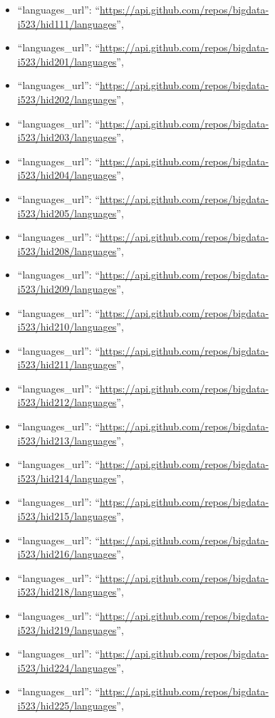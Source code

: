 \begin{itemize}
\item
  ``languages\_url'':
  ``\url{https://api.github.com/repos/bigdata-i523/hid111/languages}'',
\item
  ``languages\_url'':
  ``\url{https://api.github.com/repos/bigdata-i523/hid201/languages}'',
\item
  ``languages\_url'':
  ``\url{https://api.github.com/repos/bigdata-i523/hid202/languages}'',
\item
  ``languages\_url'':
  ``\url{https://api.github.com/repos/bigdata-i523/hid203/languages}'',
\item
  ``languages\_url'':
  ``\url{https://api.github.com/repos/bigdata-i523/hid204/languages}'',
\item
  ``languages\_url'':
  ``\url{https://api.github.com/repos/bigdata-i523/hid205/languages}'',
\item
  ``languages\_url'':
  ``\url{https://api.github.com/repos/bigdata-i523/hid208/languages}'',
\item
  ``languages\_url'':
  ``\url{https://api.github.com/repos/bigdata-i523/hid209/languages}'',
\item
  ``languages\_url'':
  ``\url{https://api.github.com/repos/bigdata-i523/hid210/languages}'',
\item
  ``languages\_url'':
  ``\url{https://api.github.com/repos/bigdata-i523/hid211/languages}'',
\item
  ``languages\_url'':
  ``\url{https://api.github.com/repos/bigdata-i523/hid212/languages}'',
\item
  ``languages\_url'':
  ``\url{https://api.github.com/repos/bigdata-i523/hid213/languages}'',
\item
  ``languages\_url'':
  ``\url{https://api.github.com/repos/bigdata-i523/hid214/languages}'',
\item
  ``languages\_url'':
  ``\url{https://api.github.com/repos/bigdata-i523/hid215/languages}'',
\item
  ``languages\_url'':
  ``\url{https://api.github.com/repos/bigdata-i523/hid216/languages}'',
\item
  ``languages\_url'':
  ``\url{https://api.github.com/repos/bigdata-i523/hid218/languages}'',
\item
  ``languages\_url'':
  ``\url{https://api.github.com/repos/bigdata-i523/hid219/languages}'',
\item
  ``languages\_url'':
  ``\url{https://api.github.com/repos/bigdata-i523/hid224/languages}'',
\item
  ``languages\_url'':
  ``\url{https://api.github.com/repos/bigdata-i523/hid225/languages}'',

\end{itemize}
